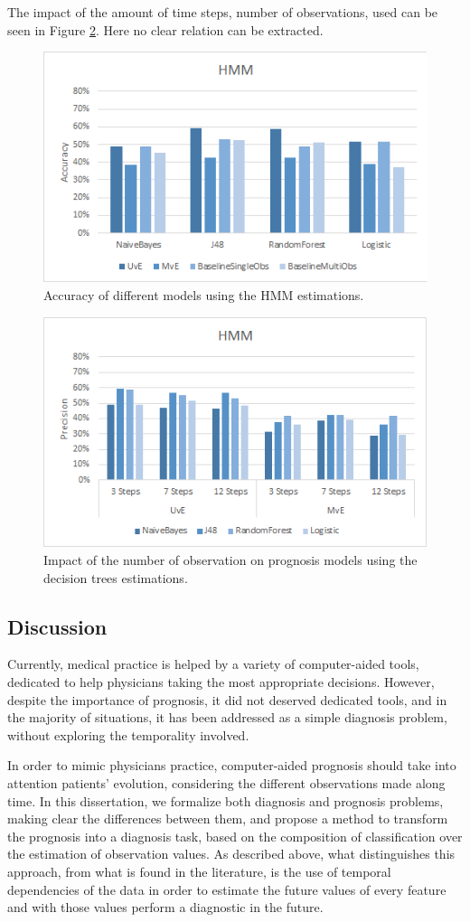The impact of the amount of time steps, number of observations, used can be seen in Figure \ref{fig:impactobservationshmm}. Here no clear relation can be extracted.

\begin{figure}[h]
	\centering
	\includegraphics[width=0.49\linewidth]{Figures/accuracy_h_hmm.png}
	\caption{Accuracy of different models using the HMM estimations.}
	\label{fig:accuracyhmm}
\end{figure}

\begin{figure}[h]
	\centering
	\includegraphics[width=0.49\linewidth]{Figures/impact_h_hmm.png}
	\caption{Impact of the number of observation on prognosis models using the decision trees estimations.}
	\label{fig:impactobservationshmm}
\end{figure}

\subsection{Discussion}
\label{subsection:discussion}

Currently, medical practice is helped by a variety of computer-aided tools, dedicated to help physicians taking the most
 appropriate decisions. However, despite the importance of prognosis, it did not deserved dedicated tools, and in the majority 
 of situations, it has been addressed as a simple diagnosis problem, without exploring the temporality involved.

In order to mimic physicians practice, computer-aided prognosis should take into attention patients’ evolution, considering the 
different observations made along time. In this dissertation, we formalize both diagnosis and prognosis problems, making clear the
 differences between them, and propose a method to transform the prognosis into a diagnosis task, based on the composition
 of classification over the estimation of observation values. As described above, what distinguishes this approach, from what 
 is found in the literature, is the use of temporal dependencies of the data in order to estimate the future values of every 
 feature and with those values perform a diagnostic in the future. 
 
